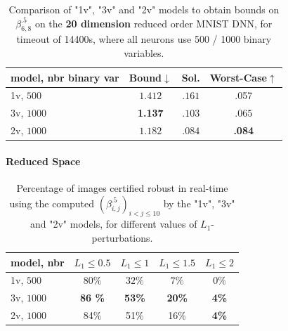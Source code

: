 \begin{table}[b!]
	\centering
	\begin{tabular}{||l||c|c|c||}\hline\hline
		model, nbr binary var &        Bound$\downarrow$ &  Sol. &      Worst-Case$\uparrow$ \\\hline \hline
	 

1v, $500$ & $1.412$ & $.161$ & .057 \\\hline 
3v, $1000$ & {\bf 1.137} & $.103$ & $.065$\\\hline 
2v, $1000$ &  $1.182$ & $.084$& {\bf .084}  \\\hline\hline
	 
	\end{tabular}
	\caption{Comparison of "1v", "3v" and "2v" models 
	to obtain bounds on $\beta^{.5}_{6,8}$ on the {\bf 20 dimension} reduced order MNIST DNN, for timeout of 14400s, where 
	all %
	neurons use 500 / 1000 binary variables.}
	\label{table.reduced}
\end{table}


\paragraph{Reduced Space}



\begin{table}[b!]
	\begin{tabular}{||l||c|c|c|c||}\hline\hline
		model, nbr &    $L_1\leq 0.5$ & $L_1\leq 1$ & $L_1\leq 1.5$ &  $L_1\leq 2$ \\\hline \hline
		1v, $500$ & $80 \%$ & $32\%$ & $7\%$ & $0\%$ \\\hline
		3v, $1000$ & {\bf 86 \%} & {\bf 53\%} & {\bf 20\%} & {\bf 4\%} \\\hline
		2v, $1000$ & 84\% & 51\% & 16\% & {\bf 4\%} \\\hline \hline
	\end{tabular}
	\caption{Percentage of images certified robust in real-time 
	using the computed $(\beta^{.5}_{i,j})_{i < j \leq 10}$ 
	by the "1v", "3v" and "2v" models, for different values of $L_1$-perturbations.}
    \label{table.cert}
\end{table}


